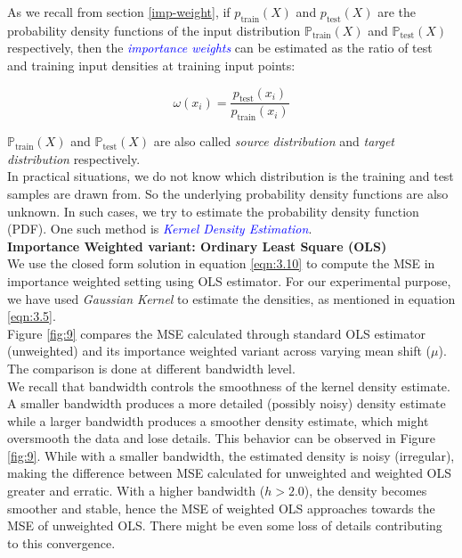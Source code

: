 As we recall from section \ref{imp-weight}, if $p_{\text{train}}(X)$ and $p_{\text{test}}(X)$ are the probability density functions of the input distribution $\mathbb{P}_{\text{train}}(X)$ and $\mathbb{P}_{\text{test}}(X)$ respectively, then the \textcolor{blue}{\emph{importance weights}} can be estimated as the ratio of test and training input densities at training input points:

\begin{equation}
    \omega(x_i) = \frac{p_{\text{test}}(x_i)}{p_{\text{train}}(x_i)}
    \label{eqn:6.11}
\end{equation}

$\mathbb{P}_{\text{train}}(X)$ and $\mathbb{P}_{\text{test}}(X)$ are also called \emph{source distribution} and \emph{target distribution} respectively.\\

In practical situations, we do not know which distribution is the training and test samples are drawn from. So the underlying probability density functions are also unknown. In such cases, we try to estimate the probability density function (PDF). One such method is \textcolor{blue}{\emph{Kernel Density Estimation}}.\\

\vspace{2em}
\textbf{Importance Weighted variant: Ordinary Least Square (OLS)}\\

We use the closed form solution in equation \ref{eqn:3.10} to compute the MSE in importance weighted setting using OLS estimator. For our experimental purpose, we have used \emph{Gaussian Kernel} to estimate the densities, as mentioned in equation \ref{eqn:3.5}.\\

Figure \ref{fig:9} compares the MSE calculated through standard OLS estimator (unweighted) and its importance weighted variant across varying mean shift ($\mu$). The comparison is done at different bandwidth level.\\

We recall that bandwidth controls the smoothness of the kernel density estimate. A smaller bandwidth produces a more detailed (possibly noisy) density estimate while a larger bandwidth produces a smoother density estimate, which might oversmooth the data and lose details. This behavior can be observed in Figure \ref{fig:9}. While with a smaller bandwidth, the estimated density is noisy (irregular), making the difference between MSE calculated for unweighted and weighted OLS greater and erratic. With a higher bandwidth ($h > 2.0$), the density becomes smoother and stable, hence the MSE of weighted OLS approaches towards the MSE of unweighted OLS. There might be even some loss of details contributing to this convergence.\\

